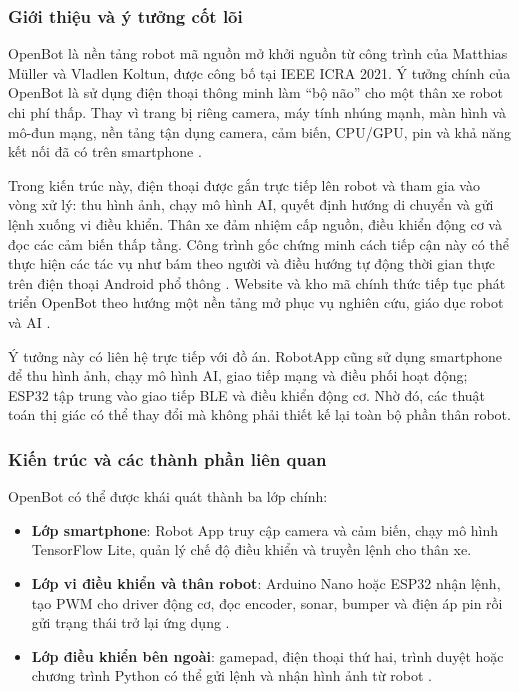\subsubsection{Giới thiệu và ý tưởng cốt lõi}

OpenBot là nền tảng robot mã nguồn mở khởi nguồn từ công trình của Matthias Müller và Vladlen Koltun, được công bố tại IEEE ICRA 2021. Ý tưởng chính của OpenBot là sử dụng điện thoại thông minh làm ``bộ não'' cho một thân xe robot chi phí thấp. Thay vì trang bị riêng camera, máy tính nhúng mạnh, màn hình và mô-đun mạng, nền tảng tận dụng camera, cảm biến, CPU/GPU, pin và khả năng kết nối đã có trên smartphone .

Trong kiến trúc này, điện thoại được gắn trực tiếp lên robot và tham gia vào vòng xử lý: thu hình ảnh, chạy mô hình AI, quyết định hướng di chuyển và gửi lệnh xuống vi điều khiển. Thân xe đảm nhiệm cấp nguồn, điều khiển động cơ và đọc các cảm biến thấp tầng. Công trình gốc chứng minh cách tiếp cận này có thể thực hiện các tác vụ như bám theo người và điều hướng tự động thời gian thực trên điện thoại Android phổ thông . Website và kho mã chính thức tiếp tục phát triển OpenBot theo hướng một nền tảng mở phục vụ nghiên cứu, giáo dục robot và AI .

Ý tưởng này có liên hệ trực tiếp với đồ án. RobotApp cũng sử dụng smartphone để thu hình ảnh, chạy mô hình AI, giao tiếp mạng và điều phối hoạt động; ESP32 tập trung vào giao tiếp BLE và điều khiển động cơ. Nhờ đó, các thuật toán thị giác có thể thay đổi mà không phải thiết kế lại toàn bộ phần thân robot.

\subsubsection{Kiến trúc và các thành phần liên quan}

OpenBot có thể được khái quát thành ba lớp chính:

\begin{itemize}
    \item \textbf{Lớp smartphone}: Robot App truy cập camera và cảm biến, chạy mô hình TensorFlow Lite, quản lý chế độ điều khiển và truyền lệnh cho thân xe.
    \item \textbf{Lớp vi điều khiển và thân robot}: Arduino Nano hoặc ESP32 nhận lệnh, tạo PWM cho driver động cơ, đọc encoder, sonar, bumper và điện áp pin rồi gửi trạng thái trở lại ứng dụng .
    \item \textbf{Lớp điều khiển bên ngoài}: gamepad, điện thoại thứ hai, trình duyệt hoặc chương trình Python có thể gửi lệnh và nhận hình ảnh từ robot .
\end{itemize}

